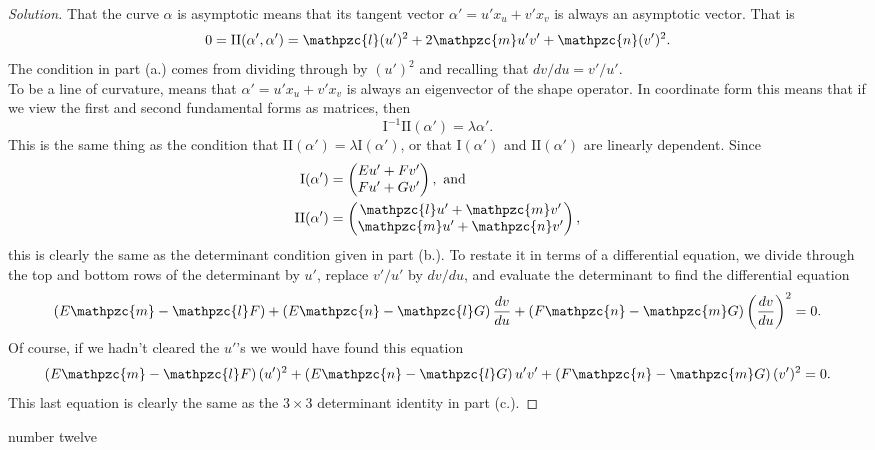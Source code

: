 \documentclass[Shifrin_Solutions_Spring_2015]{subfiles}
\begin{document}
\begin{proof}[Solution]
That the curve $\alpha$ is asymptotic means that its tangent vector $\alpha' = u' x_u + v' x_v$ is always an asymptotic vector. That is
\[
0 = \mathrm{II}(\alpha' , \alpha') = \mathpzc{l}(u')^2 + 2\mathpzc{m}u'v' + \mathpzc{n}(v')^2 .
\]
The condition in part (a.) comes from dividing through by $(u')^2$ and recalling that $dv/du = v'/u'$.\\

To be a line of curvature, means that $\alpha' = u'x_u + v'x_v$ is always an eigenvector of  the shape operator. In coordinate form this means that if we view the first and second fundamental forms as matrices, then
\[
\mathrm{I}^{-1}\mathrm{II}(\alpha') = \lambda \alpha' .
\]
This is the same thing as the condition that $\mathrm{II}(\alpha') = \lambda \mathrm{I}(\alpha')$, or that $\mathrm{I}(\alpha')$ and $\mathrm{II}(\alpha')$ are linearly dependent. Since
\begin{align*}
\mathrm{I}(\alpha') & =\begin{pmatrix} Eu' + Fv' \\ F u' + Gv' \end{pmatrix}, \text{ and} \\
\mathrm{II}(\alpha') &  = \begin{pmatrix}\mathpzc{l} u' + \mathpzc{m}v' \\ \mathpzc{m}u' + \mathpzc{n}v' \end{pmatrix} ,
\end{align*}
this is clearly the same as the determinant condition given in part (b.). To restate it in terms of a differential equation, we divide through the top and bottom rows of the determinant by $u'$, replace $v'/u'$ by $dv/du$, and evaluate the determinant to find the differential equation
\[
\left(E\mathpzc{m} - \mathpzc{l}F\right) + \left( E\mathpzc{n} - \mathpzc{l}G\right) \dfrac{dv}{du} + \left( F\mathpzc{n} - \mathpzc{m}G\right) \left( \dfrac{dv}{du}\right)^2 = 0.
\]
Of course, if we hadn't cleared the $u'$'s we would have found this equation
\[
\left(E\mathpzc{m} - \mathpzc{l}F\right)(u')^2 + \left( E\mathpzc{n} - \mathpzc{l}G\right) u'v' + \left( F\mathpzc{n} - \mathpzc{m}G\right) (v')^2 = 0.
\]
This last equation is clearly the same as the $3\times 3$ determinant identity in part (c.).


\end{proof}

\begin{exercise}
number twelve
\end{exercise}
\end{document}
